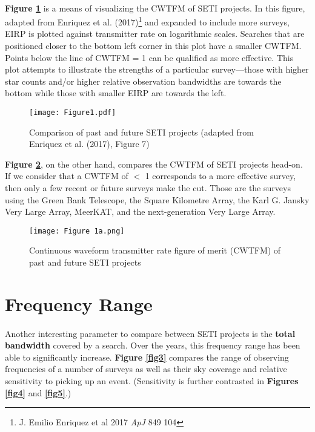 \documentclass{article}
\begin{document}
\paragraph{}
\textbf{Figure \ref{fig1}} is a means of visualizing the CWTFM of SETI projects. In this figure, adapted from Enriquez et al. (2017)\footnote{J. Emilio Enriquez et al 2017 \textit{ApJ} 849 104} and expanded to include more surveys, EIRP is plotted against transmitter rate on logarithmic scales. Searches that are positioned closer to the bottom left corner in this plot have a smaller CWTFM. Points below the line of CWTFM = 1 can be qualified as more effective. This plot attempts to illustrate the strengths of a particular survey---those with higher star counts and/or higher relative observation bandwidths are towards the bottom while those with smaller EIRP are towards the left.

\begin{figure}[H]
\begin{center}
\texttt{[image: Figure1.pdf]}
\caption{Comparison of past and future SETI projects (adapted from Enriquez et al. (2017), Figure 7) \textbf{\label{fig1}}}
\end{center}
\end{figure}

\textbf{Figure \ref{fig2}}, on the other hand, compares the CWTFM of SETI projects head-on. If we consider that a CWTFM of $<$ 1 corresponds to a more effective survey, then only a few recent or future surveys make the cut. Those are the surveys using the Green Bank Telescope, the Square Kilometre Array, the Karl G. Jansky Very Large Array, MeerKAT, and the next-generation Very Large Array.

\begin{figure}[H]
\begin{center}
\texttt{[image: Figure 1a.png]}
\caption{Continuous waveform transmitter rate figure of merit (CWTFM) of past and future SETI projects \textbf{\label{fig2}}}
\end{center}
\end{figure}


\section{Frequency Range}

\paragraph{}
Another interesting parameter to compare between SETI projects is the \textbf{total bandwidth} covered by a search. Over the years, this frequency range has been able to significantly increase. \textbf{Figure \ref{fig3}} compares the range of observing frequencies of a number of surveys as well as their sky coverage and relative sensitivity to picking up an event. (Sensitivity is further contrasted in \textbf{Figures \ref{fig4}} and \textbf{\ref{fig5}}.)
\end{document}
